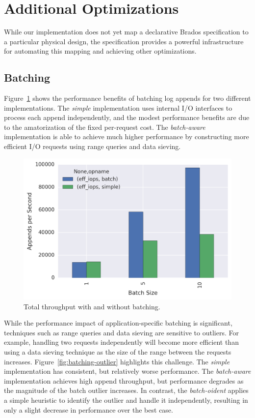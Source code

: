 \section{Additional Optimizations}
\label{sec:opts}

While our implementation does not yet map a declarative Brados specification
to a particular physical design, the specification provides a powerful
infrastructure for automating this mapping and achieving other optimizations.

\subsection{Batching}

Figure~\ref{fig:batching} shows the performance benefits of batching log
appends for two different implementations. The \emph{simple} implementation
uses internal I/O interfaces to process each append independently, and the
modest performance benefits are due to the amatorization of the fixed
per-request cost. The \emph{batch-aware} implementation is able to achieve much
higher performance by constructing more efficient I/O requests using range
queries and data sieving.

\begin{figure}
\centering
\includegraphics[width=1.0\linewidth]{batching.png}
\caption{Total throughput with and without batching.}
\label{fig:batching}
\end{figure}

While the performance impact of application-specific batching is significant,
techniques such as range queries and data sieving are sensitive to outliers.
For example, handling two requests independently will become more efficient
than using a data sieving technique as the size of the range between the
requests increases. Figure~\ref{fig:batching-outlier} highlights this
challenge. The \emph{simple} implementation has consistent, but relatively
worse performance. The \emph{batch-aware} implementation achieves high append
throughput, but performance degrades as the magnitude of the batch outlier
increases. In contrast, the \emph{batch-oident} applies a simple heuristic to
identify the outlier and handle it independently, resulting in only a slight
decrease in performance over the best case.


